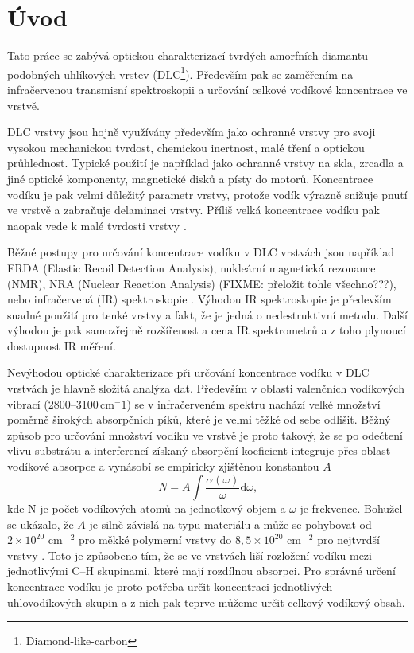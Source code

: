 \chapter{Úvod}
\setcounter{page}{1}

Tato práce se zabývá optickou charakterizací tvrdých amorfních diamantu podobných uhlíkových vrstev (DLC\footnote{Diamond-like-carbon}). Především pak se zaměřením na infračervenou transmisní spektroskopii a určování celkové vodíkové koncentrace ve vrstvě.

DLC vrstvy jsou hojně využívány především jako ochranné vrstvy pro svoji vysokou mechanickou tvrdost, chemickou inertnost, malé tření a optickou průhlednost. Typické použití je například jako ochranné vrstvy na skla, zrcadla a jiné optické komponenty, magnetické disků a písty do motorů. Koncentrace vodíku je pak velmi důležitý parametr vrstvy, protože vodík výrazně snižuje pnutí ve vrstvě a zabraňuje delaminaci vrstvy. Příliš velká koncentrace vodíku pak naopak vede k malé tvrdosti vrstvy \cite{Robertson2002}. 

Běžné postupy pro určování koncentrace vodíku v DLC vrstvách jsou například ERDA (Elastic Recoil Detection Analysis), nukleární magnetická rezonance (NMR), NRA (Nuclear Reaction Analysis) (FIXME: přeložit tohle všechno???), nebo infračervená (IR) spektroskopie \cite{Robertson2002}. Výhodou IR spektroskopie je především snadné použití pro tenké vrstvy a fakt, že je jedná o nedestruktivní metodu. Další výhodou je pak samozřejmě rozšířenost a cena IR spektrometrů a z toho plynoucí dostupnost IR měření.

Nevýhodou optické charakterizace při určování koncentrace vodíku v DLC vrstvách je hlavně složitá analýza dat. Především v oblasti valenčních vodíkových vibrací (2800--3100\,cm$^-1$) se v infračerveném spektru nachází velké množství poměrně širokých absorpčních píků, které je velmi těžké od sebe odlišit. Běžný způsob pro určování množství vodíku ve vrstvě je proto takový, že se po odečtení vlivu substrátu a interferencí získaný absorpční koeficient integruje přes oblast vodíkové absorpce a vynásobí se empiricky zjištěnou konstantou $A$
\begin{equation}
N = A \int \frac{\alpha(\omega)}{\omega} \mathrm{d}\omega \text{,}
\end{equation}
kde N je počet vodíkových atomů na jednotkový objem a $\omega$ je frekvence. Bohužel se ukázalo, že $A$ je silně závislá na typu materiálu a může se pohybovat od $2 \times 10^{20}$ cm\,$^{-2}$ pro měkké polymerní vrstvy do $8,5 \times 10^{20}$ cm\,$^{-2}$ pro nejtvrdší vrstvy \cite{jacob1996}. Toto je způsobeno tím, že se ve vrstvách liší rozložení vodíku mezi jednotlivými C--H skupinami, které mají rozdílnou absorpci. Pro správné určení koncentrace vodíku je proto potřeba určit koncentraci jednotlivých uhlovodíkových skupin a z nich pak teprve můžeme určit celkový vodíkový obsah. 

